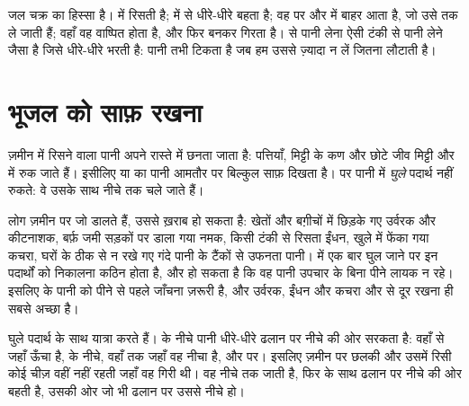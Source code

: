  जल चक्र का हिस्सा है।   में रिसती है;   में से
धीरे-धीरे बहता है; वह  पर और  में बाहर आता है, जो उसे  तक ले
जाती हैं; वहाँ वह वाष्पित होता है, और फिर  बनकर गिरता है।  से पानी
लेना ऐसी टंकी से पानी लेने जैसा है जिसे  धीरे-धीरे भरती है: पानी तभी
टिकता है जब हम उससे ज़्यादा न लें जितना  लौटाती है।

\section{भूजल को साफ़ रखना}

ज़मीन में रिसने वाला पानी अपने रास्ते में छनता जाता है: पत्तियाँ, मिट्टी के
कण और छोटे जीव मिट्टी और  में रुक जाते हैं। इसीलिए  या  का पानी
आमतौर पर बिल्कुल साफ़ दिखता है। पर पानी में \emph{घुले} पदार्थ नहीं रुकते: वे
उसके साथ नीचे  तक
चले जाते हैं।

लोग ज़मीन पर जो डालते हैं, उससे  ख़राब हो सकता है: खेतों और बग़ीचों में
छिड़के गए उर्वरक और कीटनाशक, बर्फ़ जमी सड़कों पर डाला गया नमक, किसी टंकी से
रिसता ईंधन, खुले में फेंका गया कचरा, घरों के ठीक से न रखे गए गंदे पानी के टैंकों
से उफनता पानी।  में एक बार घुल जाने पर इन पदार्थों को निकालना कठिन होता
है, और हो सकता है कि वह पानी उपचार के बिना पीने लायक न रहे। इसलिए  के पानी
को पीने से पहले जाँचना ज़रूरी है, और उर्वरक, ईंधन और कचरा  और  से दूर रखना ही सबसे अच्छा है।

घुले पदार्थ  के साथ यात्रा करते हैं।  के नीचे पानी धीरे-धीरे
ढलान पर नीचे की ओर सरकता है: वहाँ से जहाँ  ऊँचा है,  के
नीचे, वहाँ तक जहाँ वह नीचा है,  और  पर। इसलिए ज़मीन पर छलकी और
उसमें रिसी कोई चीज़ वहीं नहीं रहती जहाँ वह गिरी थी। वह नीचे  तक जाती
है, फिर  के साथ ढलान पर नीचे की ओर बहती है, उसकी ओर जो भी ढलान पर उससे
नीचे हो।

